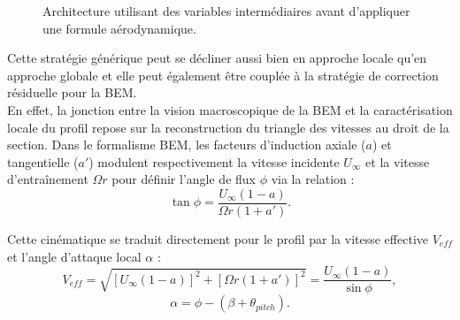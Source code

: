 \documentclass[11pt, a4paper]{article}
\begin{document}
\begin{figure}[H]
    \centering
    \caption{Architecture utilisant des variables intermédiaires avant d'appliquer une formule aérodynamique.}
    \label{fig kinematic_model}
\end{figure}

Cette stratégie générique peut se décliner aussi bien en approche locale qu'en approche globale et elle peut également être couplée à la stratégie de correction résiduelle pour la BEM. \\

En effet, la jonction entre la vision macroscopique de la BEM et la caractérisation locale du profil repose sur la reconstruction du triangle des vitesses au droit de la section. Dans le formalisme BEM, les facteurs d'induction axiale ($a$) et tangentielle ($a'$) modulent respectivement la vitesse incidente $U_\infty$ et la vitesse d'entraînement $\Omega r$ pour définir l'angle de flux $\phi$ via la relation :
\begin{equation}
    \tan \phi = \frac{U_\infty(1-a)}{\Omega r(1+a')}.
\end{equation}

Cette cinématique se traduit directement pour le profil par la vitesse effective $V_{eff}$ et l'angle d'attaque local $\alpha$ :
\begin{equation}
    V_{eff} = \sqrt{\left[ U_\infty(1-a) \right]^2 + \left[ \Omega r (1+a') \right]^2} = \frac{U_\infty(1-a)}{\sin \phi},
\end{equation}
\begin{equation}
    \alpha = \phi - (\beta + \theta_{pitch}).
\end{equation}
\end{document}
